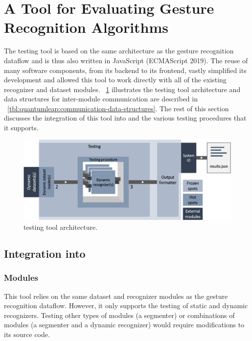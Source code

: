 \section{A Tool for Evaluating Gesture Recognition Algorithms} \label{sec:quantumleap-testing:description}
The \ql testing tool is based on the same architecture as the gesture recognition dataflow and is thus also written in JavaScript (ECMAScript 2019). The reuse of many \ql software components, from its backend to its frontend, vastly simplified its development and allowed this tool to work directly with all of the existing recognizer and dataset modules. \fig~\ref{fig:quantumleap-testing:archi} illustrates the testing tool architecture and data structures for inter-module communication are described in \tab~\ref{tbl:quantumleap:communication-data-structures}.
%
The rest of this section discusses the integration of this tool into \ql and the various testing procedures that it supports.

\begin{figure}[!b]
  \centering
  \includegraphics[width=\linewidth]{Figures/QuantumLeapTesting/quantumleap-testing.pdf}
  \vspace{-8pt}
  \caption{\ql testing tool architecture.}
  \label{fig:quantumleap-testing:archi}
\end{figure}

\subsection{Integration into \ql} \label{sec:quantumleap-testing:description:ql-integration}
\subsubsection{Modules} \label{sec:quantumleap-testing:description:ql-integration:modules}
This tool relies on the same dataset and recognizer modules as the \ql gesture recognition dataflow. However, it only supports the testing of static and dynamic recognizers. Testing other types of modules (\eg a segmenter) or combinations of modules (\eg a segmenter and a dynamic recognizer) would require modifications to its source code.

